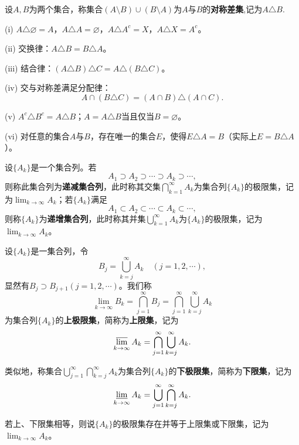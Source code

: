 \documentclass[lang=cn,newtx,10pt,scheme=chinese]{../Template/elegantbook}
\begin{document}
\begin{definition}[集合的对称差]\label{definition:集合的对称差}
  设\(A,B\)为两个集合，称集合\((A\setminus B)\cup(B\setminus A)\)为\(A\)与\(B\)的\textbf{对称差集},记为\(A\triangle B\).
\end{definition}

\begin{proposition}[集合的对称差的基本性质]\label{proposition:集合的对称差的基本性质}
  (i) \(A\triangle\varnothing = A\)，\(A\triangle A=\varnothing\)，\(A\triangle A^c = X\)，\(A\triangle X = A^c\)。

(ii) 交换律：\(A\triangle B = B\triangle A\)。

(iii) 结合律：\((A\triangle B)\triangle C = A\triangle(B\triangle C)\)。

(iv) 交与对称差满足分配律：
\[A\cap(B\triangle C)=(A\cap B)\triangle(A\cap C).\]

(v) \(A^c\triangle B^c = A\triangle B\)；\(A = A\triangle B\)当且仅当\(B = \varnothing\)。

(vi) 对任意的集合\(A\)与\(B\)，存在唯一的集合\(E\)，使得\(E\triangle A = B\)（实际上\(E = B\triangle A\)）。
\end{proposition}

\begin{definition}[递增、递减集合列]\label{definition:递增、递减集合列}
设\(\{A_k\}\)是一个集合列。若
\[A_1\supset A_2\supset\cdots\supset A_k\supset\cdots,\]
则称此集合列为\textbf{递减集合列}，此时称其交集\(\bigcap_{k = 1}^{\infty}A_k\)为集合列\(\{A_k\}\)的极限集，记为\(\lim_{k\rightarrow\infty}A_k\)；若\(\{A_k\}\)满足
\[A_1\subset A_2\subset\cdots\subset A_k\subset\cdots,\]
则称\(\{A_k\}\)为\textbf{递增集合列}，此时称其并集\(\bigcup_{k = 1}^{\infty}A_k\)为\(\{A_k\}\)的极限集，记为\(\lim_{k\rightarrow\infty}A_k\)。
\end{definition}

\begin{definition}[上、下极限集]\label{definition:上、下极限集}
  设\(\{A_k\}\)是一集合列，令
\[B_j=\bigcup_{k = j}^{\infty}A_k\quad (j = 1,2,\cdots),\]
显然有\(B_j\supset B_{j + 1}(j = 1,2,\cdots)\)。我们称
\[\lim_{k\rightarrow\infty}B_k=\bigcap_{j = 1}^{\infty}B_j=\bigcap_{j = 1}^{\infty}\bigcup_{k = j}^{\infty}A_k\]
为集合列\(\{A_k\}\)的\textbf{上极限集}，简称为\textbf{上限集}，记为
\[\varlimsup_{k\rightarrow\infty}A_k=\bigcap_{j = 1}^{\infty}\bigcup_{k = j}^{\infty}A_k.\]

类似地，称集合\(\bigcup_{j = 1}^{\infty}\bigcap_{k = j}^{\infty}A_k\)为集合列\(\{A_k\}\)的\textbf{下极限集}，简称为\textbf{下限集}，记为
\[\varliminf_{k\rightarrow\infty}A_k=\bigcup_{j = 1}^{\infty}\bigcap_{k = j}^{\infty}A_k.\]

若上、下限集相等，则说\(\{A_k\}\)的极限集存在并等于上限集或下限集，记为\(\lim_{k\rightarrow\infty}A_k\)。
\end{definition}
\end{document}

